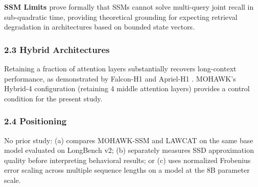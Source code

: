 \textbf{SSM Limits \citep{Zhan2025}} prove formally that SSMs cannot solve multi-query joint recall in sub-quadratic time, providing theoretical grounding for expecting retrieval degradation in architectures based on bounded state vectors.

\subsubsection{2.3 Hybrid Architectures}

Retaining a fraction of attention layers substantially recovers long-context performance, as demonstrated by Falcon-H1 \citep{Zuo2025} and Apriel-H1 \citep{Ostapenko2025}. MOHAWK's Hybrid-4 configuration (retaining 4 middle attention layers) provides a control condition for the present study.

\subsubsection{2.4 Positioning}

No prior study: (a) compares MOHAWK-SSM and LAWCAT on the same base model evaluated on LongBench v2; (b) separately measures SSD approximation quality before interpreting behavioral results; or (c) uses normalized Frobenius error scaling across multiple sequence lengths on a model at the 8B parameter scale.

